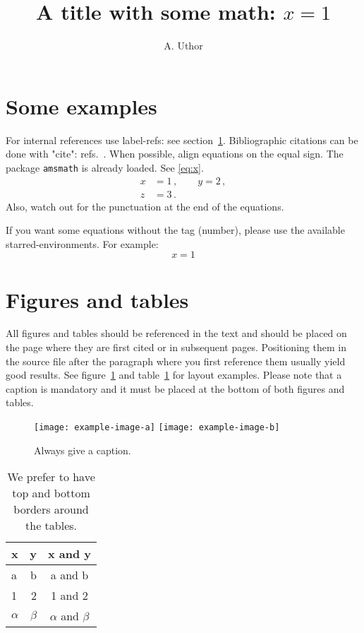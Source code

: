 \documentclass[a4paper,11pt]{article}
\title{\boldmath A title with some math: $x=1$}
\author{A. Uthor}
\affiliation{One University,\\
some-street, Country}
\affiliation{Another University,\\
different-address, Country}
\begin{document}
\maketitle
\flushbottom

\section{Some examples}
\label{sec:intro}

For internal references use label-refs: see section~\ref{sec:intro}.
Bibliographic citations can be done with "cite": refs.~\cite{a,b,c}.
When possible, align equations on the equal sign. The package
\texttt{amsmath} is already loaded. See \eqref{eq:x}.
\begin{equation}
\label{eq:x}
\begin{aligned}
x &= 1 \,,
\qquad
y = 2 \,,
\\
z &= 3 \,.
\end{aligned}
\end{equation}
Also, watch out for the punctuation at the end of the equations.


If you want some equations without the tag (number), please use the available
starred-environments. For example:
\begin{equation*}
x = 1
\end{equation*}

\section{Figures and tables}

All figures and tables should be referenced in the text and should be
placed on the page where they are first cited or in
subsequent pages. Positioning them in the source file
after the paragraph where you first reference them usually yield good
results. See figure~\ref{fig:i} and table~\ref{tab:i} for layout examples. 
Please note that a caption is mandatory  and it must be placed at the bottom of both figures and tables.

\begin{figure}[htbp]
\centering
\texttt{[image: example-image-a]}
\qquad
\texttt{[image: example-image-b]}
\caption{Always give a caption.\label{fig:i}}
\end{figure}

\begin{table}[htbp]
\centering
\begin{tabular}{lr|c}
\hline
x&y&x and y\\
\hline
a & b & a and b\\
1 & 2 & 1 and 2\\
$\alpha$ & $\beta$ & $\alpha$ and $\beta$\\
\hline
\end{tabular}
\caption{We prefer to have top and bottom borders around the tables.\label{tab:i}}
\end{table}
\end{document}
